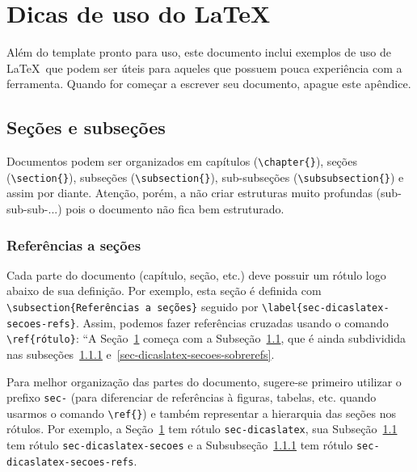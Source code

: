 \section{Dicas de uso do \LaTeX}
\label{sec-dicaslatex}

Além do template pronto para uso, este documento inclui exemplos de uso de \LaTeX\ que podem ser úteis para aqueles que possuem pouca experiência com a ferramenta. Quando for começar a escrever seu documento, apague este apêndice.



\subsection{Seções e subseções}
\label{sec-dicaslatex-secoes}

Documentos podem ser organizados em capítulos (\texttt{\textbackslash chapter\{\}}), seções (\texttt{\textbackslash section\{\}}), subseções (\texttt{\textbackslash subsection\{\}}), sub-subseções (\texttt{\textbackslash subsubsection\{\}}) e assim por diante. Atenção, porém, a não criar estruturas muito profundas (sub-sub-sub-...) pois o documento não fica bem estruturado.


\subsubsection{Referências a seções}
\label{sec-dicaslatex-secoes-refs}

Cada parte do documento (capítulo, seção, etc.) deve possuir um rótulo logo abaixo de sua definição. Por exemplo, esta seção é definida com \texttt{\textbackslash subsection\{Referências a seções\}} seguido por \texttt{\textbackslash label\{sec-dicaslatex-secoes-refs\}}. Assim, podemos fazer referências cruzadas usando o comando \texttt{\textbackslash ref\{rótulo\}}: ``A Seção~\ref{sec-dicaslatex} começa com a Subseção~\ref{sec-dicaslatex-secoes}, que é ainda subdividida nas subseções~\ref{sec-dicaslatex-secoes-refs} e~\ref{sec-dicaslatex-secoes-sobrerefs}.

Para melhor organização das partes do documento, sugere-se primeiro utilizar o prefixo \texttt{sec-} (para diferenciar de referências à figuras, tabelas, etc. quando usarmos o comando \texttt{\textbackslash ref\{\}}) e também representar a hierarquia das seções nos rótulos. Por exemplo, a Seção~\ref{sec-dicaslatex} tem rótulo \texttt{sec-dicaslatex}, sua Subseção~\ref{sec-dicaslatex-secoes} tem rótulo \texttt{sec-dicaslatex-secoes} e a Subsubseção~\ref{sec-dicaslatex-secoes-refs} tem rótulo \texttt{sec-dicaslatex-secoes-refs}.



